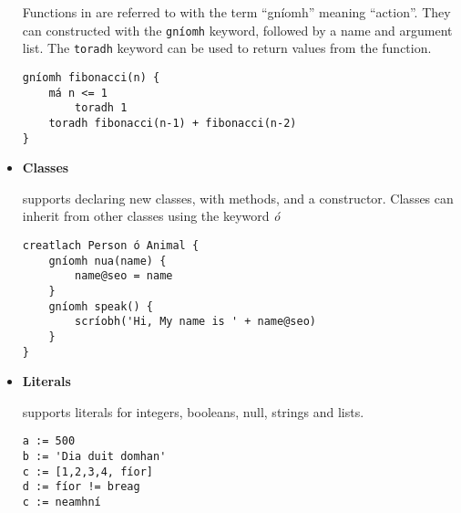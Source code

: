 \begin{itemize}
            Functions in \Setanta{} are referred to with the term ``gníomh'' meaning ``action''. They can constructed with the \lstinline[language=setanta]|gníomh| keyword, followed by a name and argument list. The \lstinline[language=setanta]|toradh| keyword can be used to return values from the function.
            \begin{lstlisting}[language=setanta, frame=single, caption=Setanta function example]
gníomh fibonacci(n) {
    má n <= 1
        toradh 1
    toradh fibonacci(n-1) + fibonacci(n-2)
}
            \end{lstlisting}
        \item \textbf{Classes}

            \Setanta{} supports declaring new classes, with methods, and a constructor.  Classes can inherit from other classes using the keyword \emph{ó}
            \begin{lstlisting}[language=setanta, frame=single, caption=Setanta classe example]
creatlach Person ó Animal {
    gníomh nua(name) {
        name@seo = name
    }
    gníomh speak() {
        scríobh('Hi, My name is ' + name@seo)
    }
}
            \end{lstlisting}
        \item \textbf{Literals}

            \Setanta{} supports literals for integers, booleans, null, strings and lists.
            \begin{lstlisting}[language=setanta, frame=single, caption=Setanta literals]
a := 500
b := 'Dia duit domhan'
c := [1,2,3,4, fíor]
d := fíor != breag
c := neamhní
            \end{lstlisting}
\end{itemize}
